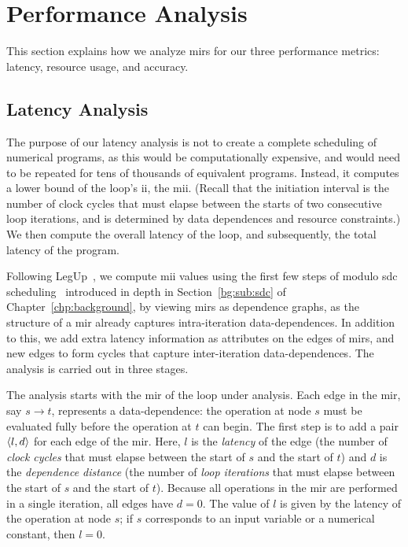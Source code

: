\section{Performance Analysis}
\label{lo:sec:performance_analysis}

This section explains how we analyze \glspl{mir} for our three performance
metrics: latency, resource usage, and accuracy.

\subsection{Latency Analysis}
\label{lo:sub:latency}

The purpose of our latency analysis is not to create a complete scheduling
of numerical programs, as this would be computationally expensive, and would
need to be repeated for tens of thousands of equivalent programs.  Instead, it
computes a lower bound of the loop's \gls{ii}, the \acrfull{mii}.  (Recall that
the initiation interval is the number of clock cycles that must elapse between
the starts of two consecutive loop iterations, and is determined by data
dependences and resource constraints.)  We then compute the overall latency of
the loop, and subsequently, the total latency of the program.

Following LegUp~\cite{legup}, we compute \gls{mii} values using the first
few steps of modulo \gls{sdc} scheduling~\cite{canis14} introduced in depth
in Section~\ref{bg:sub:sdc} of Chapter~\ref{chp:background}, by viewing
\glspl{mir} as dependence graphs, as the structure of a \gls{mir} already
captures intra-iteration data-dependences.  In addition to this, we add extra
latency information as attributes on the edges of \glspl{mir}, and new edges
to form cycles that capture inter-iteration data-dependences.  The analysis is
carried out in three stages.

The analysis starts with the \gls{mir} of the loop under analysis. Each edge
in the \gls{mir}, say $s\rightarrow t$, represents a data-dependence: the
operation at node $s$ must be evaluated fully before the operation at $t$
can begin.  The first step is to add a pair $\langle{l},{d}\rangle$ for each edge of
the \gls{mir}\@.  Here, $l$ is the \emph{latency} of the edge (the number of
\emph{clock cycles} that must elapse between the start of $s$ and the start
of $t$) and $d$ is the \emph{dependence distance} (the number of \emph{loop
iterations} that must elapse between the start of $s$ and the start of $t$).
Because all operations in the \gls{mir} are performed in a single iteration,
all edges have $d=0$.  The value of $l$ is given by the latency of the
operation at node $s$; if $s$ corresponds to an input variable or a numerical
constant, then $l=0$.


